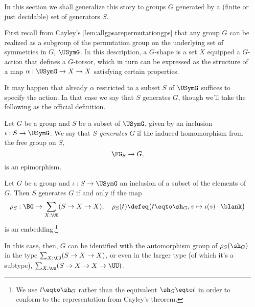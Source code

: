 In this section we shall generalize this story
to groups $G$ generated by a
(finite or just decidable)
set of generators $S$.

First recall from Cayley's \cref{lem:allgpsarepermutationgps}
that any group $G$ can be realized as a subgroup of the permutation group
on the underlying set of symmetries in $G$, $\USymG$.
In this description, a $G$-shape is a set $X$ equipped
a $G$-action that defines a $G$-torsor,
which in turn can be expressed as the structure of a map $\alpha:\USymG \to X \to X$
satisfying certain properties.

It may happen that already $\alpha$ restricted to a subset $S$ of $\USymG$
suffices to specify the action.
In that case we say that $S$ generates $G$, though we'll take the following
as the official definition.
\begin{definition}\label{def:gens-gp}
  Let $G$ be a group and $S$ be a subset of $\USymG$, given by an inclusion
  $\iota : S \to \USymG$. We say that \emph{$S$ generates $G$} if the induced
  homomorphism from the free group on $S$,
  \[
    \FG_S \to G,
  \]
  is an epimorphism.
\end{definition}
\begin{lemma}\label{lem:gens-gp-iff}
  Let $G$ be a group
  and $\iota : S \to \USymG$ an inclusion of a subset of the elements of $G$.
  Then $S$ generates $G$ if and only if the map
  \[
    \rho_S : \BG \to \sum_{X:\UU}(S \to X \to X) ,
    \quad
    \rho_S(t) \defeq \bigl(t \eqto \sh_G, s \mapsto \iota(s) \cdot \blank\bigr)
  \]
  is an embedding.\footnote{We use $t \eqto \sh_G$ rather than the equivalent
    $\sh_G \eqto t$ in order to conform to the representation from Cayley's theorem.}
\end{lemma}
In this case, then, $G$ can be identified with the automorphism group of $\rho_S(\sh_G)$
in the type $\sum_{X:\UU}(S \to X \to X)$, or even in the larger type (of which it's a subtype), $\sum_{X:\UU}(S \to X \to X \to \UU)$.

